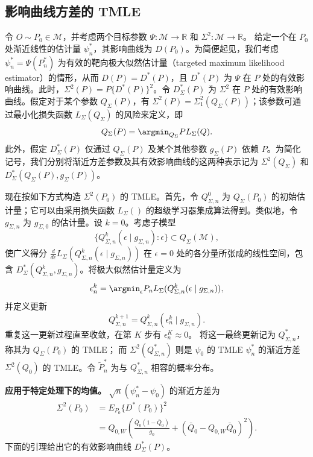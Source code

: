 \subsection{影响曲线方差的 TMLE}

令 $O\sim P_0\in\mathcal M$，并考虑两个目标参数
$\Psi:\mathcal M\to\mathbb R$ 和 $\Sigma^2:\mathcal M\to\mathbb R$。
给定一个在 $P_0$ 处渐近线性的估计量 $\psi_n^*$，其影响曲线为 $D(P_0)$。为简便起见，我们考虑 $\psi_n^*=\Psi(P_n^*)$ 为有效的靶向极大似然估计量（targeted maximum likelihood estimator）的情形，从而 $D(P)=D^*(P)$，且 $D^*(P)$ 为 $\Psi$ 在 $P$ 处的有效影响曲线。此时，$\Sigma^2(P)=P\{D^*(P)\}^2$。令 $D_\Sigma^*(P)$ 为 $\Sigma^2$ 在 $P$ 处的有效影响曲线。假定对于某个参数 $Q_\Sigma(P)$，有
$\Sigma^2(P)=\Sigma_1^2(Q_\Sigma(P))$；该参数可通过最小化损失函数 $L_\Sigma(Q_\Sigma)$ 的风险来定义，即
\[
 Q_\Sigma(P)=\argmin_{Q_\Sigma}PL_\Sigma(Q).
\]
此外，假定 $D_\Sigma^*(P)$ 仅通过 $Q_\Sigma(P)$ 及某个其他参数 $g_\Sigma(P)$ 依赖 $P$。为简化记号，我们分别将渐近方差参数及其有效影响曲线的这两种表示记为
$\Sigma^2(Q_\Sigma)$ 和 $D_\Sigma^*(Q_\Sigma(P),g_\Sigma(P))$。

现在按如下方式构造 $\Sigma^2(P_0)$ 的 TMLE。首先，令 $Q_{\Sigma,n}^0$ 为 $Q_\Sigma(P_0)$ 的初始估计量；它可以由采用损失函数 $L_\Sigma()$ 的超级学习器集成算法得到。类似地，令 $g_{\Sigma,n}$ 为 $g_{\Sigma,0}$ 的估计量。设 $k=0$。考虑子模型
\[
 \{Q_{\Sigma,n}^k(\epsilon\mid g_{\Sigma,n}):\epsilon\}
 \subset Q_\Sigma(\mathcal M),
\]
使广义得分
$\frac{d}{d\epsilon}L_\Sigma(Q_{\Sigma,n}^k(\epsilon\mid g_{\Sigma,n}))$
在 $\epsilon=0$ 处的各分量所张成的线性空间，包含
$D_\Sigma^*(Q_{\Sigma,n}^k,g_{\Sigma,n})$。将极大似然估计量定义为
\[
 \epsilon_n^k=\argmin_\epsilon
 P_nL_\Sigma(Q_{\Sigma,n}^k(\epsilon\mid g_{\Sigma,n})),
\]
并定义更新
\[
 Q_{\Sigma,n}^{k+1}=Q_{\Sigma,n}^k(\epsilon_n^k\mid g_{\Sigma,n}).
\]
重复这一更新过程直至收敛，在第 $K$ 步有 $\epsilon_n^K\approx0$。
将这一最终更新记为 $Q_{\Sigma,n}^*$，称其为 $Q_\Sigma(P_0)$ 的 TMLE；
而 $\Sigma^2(Q_{\Sigma,n}^*)$ 则是 $\psi_0$ 的 TMLE $\psi_n^*$ 的渐近方差 $\Sigma^2(Q_0)$ 的 TMLE。令 $\tilde P_n^*$ 为与 $Q_{\Sigma,n}^*$ 相容的概率分布。

\noindent\textbf{应用于特定处理下的均值。}\enspace
$\sqrt n(\psi_n^*-\psi_0)$ 的渐近方差为
\[
\begin{aligned}
 \Sigma^2(P_0)&=E_{P_0}\{D^*(P_0)\}^2\\
 &=Q_{0,W}\left(
 \frac{\bar Q_0(1-\bar Q_0)}{\bar g_0}
 +(\bar Q_0-Q_{0,W}\bar Q_0)^2\right).
\end{aligned}
\]
下面的引理给出它的有效影响曲线 $D_\Sigma^*(P)$。

